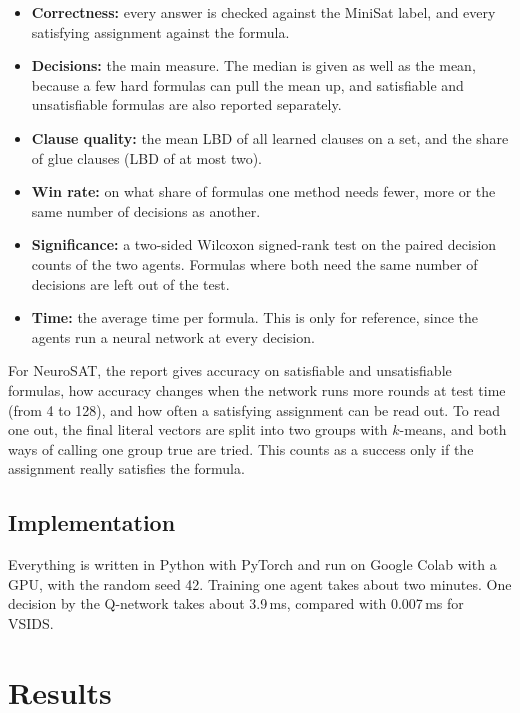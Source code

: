 \documentclass[11pt,a4paper]{article}
\begin{document}
\begin{itemize}
    \item \textbf{Correctness:} every answer is checked against the MiniSat label, and every satisfying assignment against the formula.
    \item \textbf{Decisions:} the main measure. The median is given as well as the mean, because a few hard formulas can pull the mean up, and satisfiable and unsatisfiable formulas are also reported separately.
    \item \textbf{Clause quality:} the mean LBD of all learned clauses on a set, and the share of glue clauses (LBD of at most two).
    \item \textbf{Win rate:} on what share of formulas one method needs fewer, more or the same number of decisions as another.
    \item \textbf{Significance:} a two-sided Wilcoxon signed-rank test on the paired decision counts of the two agents. Formulas where both need the same number of decisions are left out of the test.
    \item \textbf{Time:} the average time per formula. This is only for reference, since the agents run a neural network at every decision.
\end{itemize}

For NeuroSAT, the report gives accuracy on satisfiable and unsatisfiable formulas, how accuracy changes when the network runs more rounds at test time (from 4 to 128), and how often a satisfying assignment can be read out. To read one out, the final literal vectors are split into two groups with $k$-means, and both ways of calling one group true are tried. This counts as a success only if the assignment really satisfies the formula.

\subsection{Implementation}

Everything is written in Python with PyTorch and run on Google Colab with a GPU, with the random seed 42. Training one agent takes about two minutes. One decision by the Q-network takes about 3.9\,ms, compared with 0.007\,ms for VSIDS.

\section{Results}
\label{sec:results}
\end{document}
